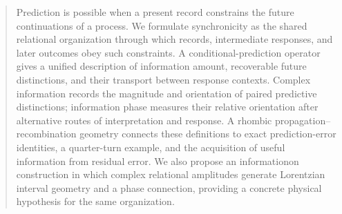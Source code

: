 \documentclass{article}
\theoremstyle{definition}
\begin{document}
\printAffiliationsAndNotice{}
\begin{abstract}
Prediction is possible when a present record constrains the future continuations of a process. We formulate synchronicity as the shared relational organization through which records, intermediate responses, and later outcomes obey such constraints. A conditional-prediction operator gives a unified description of information amount, recoverable future distinctions, and their transport between response contexts. Complex information records the magnitude and orientation of paired predictive distinctions; information phase measures their relative orientation after alternative routes of interpretation and response. A rhombic propagation--recombination geometry connects these definitions to exact prediction-error identities, a quarter-turn example, and the acquisition of useful information from residual error. We also propose an informationon construction in which complex relational amplitudes generate Lorentzian interval geometry and a phase connection, providing a concrete physical hypothesis for the same organization.
\end{abstract}







\clearpage
\raggedbottom
\balance


\clearpage
\nobalance
\appendix
\onecolumn

\end{document}
